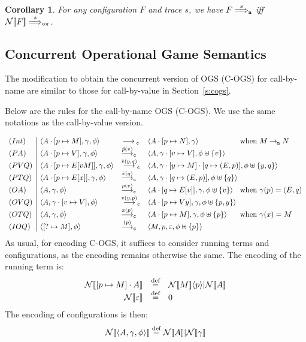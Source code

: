 \documentclass[11pt,a4paper]{amsart}
\theoremstyle{plain}
\theoremstyle{definition}
\theoremstyle{defC}
\theoremstyle{thmC}
\theoremstyle{plain}
\numberwithin{equation}{section}
\newcommand{\pairP}[1]{  #1 }      %
\newcommand{\COGS}{\mbox{{\rm C-OGS}}\xspace}      %
\newcommand{\obj}[1]{\langle #1 \rangle}
\def\nil{0}
\def\app#1#2{#1\obj{#2}}                    %
\newcommand{\rmm}[1]{{\tt{\lowercase{#1}}}}
\newcommand{\genarr}[2]{\mathrel{\stackrel{{#1}}{\longrightarrow}_{\rmm{\lowercase{#2}}}}}
\newcommand{\genArr}[2]{\mathrel{\stackrel{{#1}}{\Longrightarrow}_{\rmm{\lowercase{#2}}}}}  %
\newcommand{\ArrA}[1]{\genArr{#1}{A}}  %
\newcommand{\arrC}[1]{\genarr{#1}{C}}   %
\newcommand{\ArrN}[1]{\genArr{#1}{o\pi}}  %
\def\defi{\stackrel{\mbox{\scriptsize {\rm{def}}}}{=}} %
\newcommand{\FF}{F}
\newcommand{\encoN}[1]{{\mathcal {N}} [\! [ #1 ] \! ]  }
\newcommand{\encoNa}[2]{{\mathcal {N}} \app{[\! [ #1 ] \! ]}{#2}  }
\newcommand{\emptymap}{\varepsilon}
\newcommand{\pmap}[2]{[#1 \mapsto #2]}
\newcommand{\redn}{\rightarrow_{\tt{n}}}
\newcommand{\ansP}[2]{\bar{#1}(#2)}
\newcommand{\questPV}[3]{\bar{#1}(#2,#3)}
\newcommand{\questPT}[2]{\bar{#1}(#2)}
\newcommand{\ansO}[2]{#1(#2)}
\newcommand{\questOV}[3]{#1(#2,#3)}
\newcommand{\questOT}[2]{#1(#2)}
\newcommand{\questOinit}[1]{(#1)}
\newcommand{\conf}[1]{\langle #1\rangle}
\newcommand{\initconf}[2]{\langle[? \mapsto #2], #1\rangle}
\theoremstyle{plain}
\newtheorem{corollary}[thm]{Corollary}
\theoremstyle{definition}
\begin{document}
\begin{corollary}
\label{c:CBNtraces}
For any configuration $\FF$ and trace $s$,
 we have 
  $\FF \ArrA s$   iff 
 $ \encoN \FF  \ArrN s$.
\end{corollary} 

\subsection{Concurrent Operational Game Semantics}
\label{ss:cogs_cbn}
             

The modification to obtain the concurrent version of OGS (\COGS) for call-by-name are
similar to those for call-by-value in Section~\ref{s:cogs}. 

Below are the rules for the call-by-name  OGS (\COGS).  
We use the same notations as the call-by-value version. 

 \setlength{\arraycolsep}{3pt}%
 \[
  \begin{array}{l|lll@{}l}
   (Int) & \conf{A \cdot \pmap{p}{M},\gamma,\phi} & \arrC{\qquad} & 
     \conf{A \cdot \pmap{p}{N},\gamma} & \text{ when } M \redn N\\
%
%
   (PA) & \conf{A \cdot \pmap{p}{V},\gamma,\phi} & \arrC{\ansP{p}{v}} & 
     \conf{A, \gamma \cdot \pmap{v}{V},\phi\uplus \{v\}} \\
%
   (PVQ) & \conf{A \cdot \pmap{p}{E[vM]},\gamma,\phi} & \arrC{\questPV{v}{y}{q}} & 
     \multicolumn{2}{l}{\conf{A, \gamma \cdot \pmap{y}{M}\cdot \pmap{q}{(E,p)},\phi\uplus \{y,q\}}} \\
%
   (PTQ) & \conf{A \cdot \pmap{p}{E[x]},\gamma,\phi} & \arrC{\questPT{x}{q}} & 
     \conf{A, \gamma \cdot \pmap{q}{(E,p)},\phi \uplus \{q\}} \\
%
   (OA) & \conf{A, \gamma,\phi} & \arrC{\ansO{p}{v}} & 
     \conf{A \cdot \pmap{q}{E[v]},\gamma,\phi \uplus \{v\}} & \text{ when } \gamma(p) = (E,q)  \\

%
   (OVQ) & \conf{A, \gamma \cdot [v \mapsto V],\phi} & \arrC{\questOV{v}{y}{p}} & 
     \conf{A \cdot \pmap{p}{V y},\gamma,\phi \uplus \{p,y\}} &\\
%
   (OTQ) & \conf{A,\gamma,\phi} & \arrC{\questOT{x}{p}} & 
     \conf{A \cdot \pmap{p}{M},\gamma,\phi \uplus \{p\}} & \text{ when } \gamma(x) = M\\
%
   (IOQ) &\initconf{\phi}{M}  & 
 \arrC{\questOinit{p}}
 &
     \conf{M,p,\emptymap,\phi \uplus \{p\}}
  \end{array}
 \]
\noindent
As usual, for encoding   \COGS,
it suffices  to consider
 running
terms and configurations,  as the encoding remains otherwise the same.
The encoding of the running term is: 
\[ 
\begin{array}{rcl}
\encoN{\pmap{p}{M}\cdot A  } & \defi & 
\encoNa  {M}{p} | \encoN{ A  } \\
\encoN{\emptymap} & \defi & \nil
\end{array} 
\]
The encoding of configurations is then:
\[
\encoN{\conf{ A , \gamma, \phi } }
\defi  \pairP{  \encoN A
 | \encoN \gamma }
\]
\end{document}
